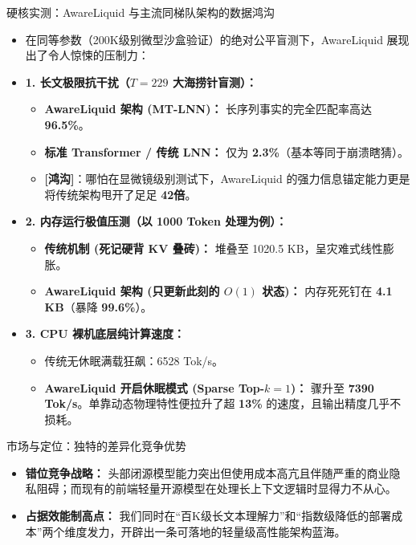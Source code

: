 ﻿\documentclass[aspectratio=169, 10pt]{beamer}
\begin{document}
\begin{frame}{硬核实测：AwareLiquid 与主流同梯队架构的数据鸿沟}
\begin{itemize}
    \item 在同等参数（200K级别微型沙盒验证）的绝对公平盲测下，AwareLiquid 展现出了令人惊悚的压制力：
    \vspace{0.5em}
    \item \textbf{1. 长文极限抗干扰（$T=229$ 大海捞针盲测）：}
    \begin{itemize}
        \item \textbf{AwareLiquid 架构 (MT-LNN)：} 长序列事实的完全匹配率高达 \textbf{96.5\%}。
        \item \textbf{标准 Transformer / 传统 LNN：} 仅为 \textbf{2.3\%}（基本等同于崩溃瞎猜）。
        \item \textbf{[鸿沟]}：哪怕在显微镜级别测试下，AwareLiquid 的强力信息锚定能力更是将传统架构甩开了足足 \textbf{42倍}。
    \end{itemize}
    \vspace{0.3em}
    \item \textbf{2. 内存运行极值压测（以 1000 Token 处理为例）：}
    \begin{itemize}
        \item \textbf{传统机制 (死记硬背 KV 叠砖)：} 堆叠至 1020.5 KB，呈灾难式线性膨胀。
        \item \textbf{AwareLiquid 架构 (只更新此刻的 $O(1)$ 状态)：} 内存死死钉在 \textbf{4.1 KB}（暴降 \textbf{99.6\%}）。
    \end{itemize}
    \vspace{0.3em}
    \item \textbf{3. CPU 裸机底层纯计算速度：}
    \begin{itemize}
        \item 传统无休眠满载狂飙：6528 Tok/s。
        \item \textbf{AwareLiquid 开启休眠模式 (Sparse Top-$k=1$)：} 骤升至 \textbf{7390 Tok/s}。单靠动态物理特性便拉升了超 \textbf{13\%} 的速度，且输出精度几乎不损耗。
    \end{itemize}
\end{itemize}
\end{frame}

\begin{frame}{市场与定位：独特的差异化竞争优势}
\begin{itemize}
    \item \textbf{错位竞争战略：} 头部闭源模型能力突出但使用成本高亢且伴随严重的商业隐私阻碍；而现有的前端轻量开源模型在处理长上下文逻辑时显得力不从心。
    \item \textbf{占据效能制高点：} 我们同时在“百K级长文本理解力”和“指数级降低的部署成本”两个维度发力，开辟出一条可落地的轻量级高性能架构蓝海。
\end{itemize}
\end{frame}
\end{document}
